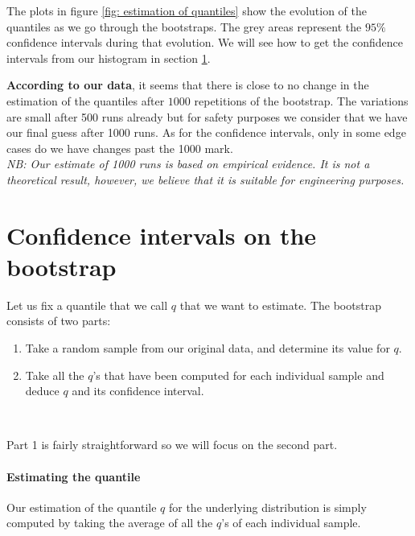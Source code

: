 \documentclass{article}
\begin{document}
The plots in figure \ref{fig: estimation of quantiles} show the evolution of the quantiles as we go through the bootstraps. The grey areas represent the $95\%$ confidence intervals during that evolution. We will see how to get the confidence intervals from our histogram in section \ref{section: confidence intervals on the bootstrap}.

\textbf{According to our data}, it seems that there is close to no change in the estimation of the quantiles after $1000$ repetitions of the bootstrap. The variations are small after 500 runs already but for safety purposes we consider that we have our final guess after 1000 runs. As for the confidence intervals, only in some edge cases do we have changes past the 1000 mark. \\
\textit{NB: Our estimate of 1000 runs is based on empirical evidence. It is not a theoretical result, however, we believe that it is suitable for engineering purposes.}


\section{Confidence intervals on the bootstrap}
\label{section: confidence intervals on the bootstrap}

Let us fix a quantile that we call $q$ that we want to estimate. The bootstrap consists of two parts:

\begin{enumerate}
    \item[Part 1] Take a random sample from our original data, and determine its value for $q$.
    \item[Part 2] Take all the $q$'s that have been computed for each individual sample and deduce $q$ and its confidence interval.
\end{enumerate}\

Part 1 is fairly straightforward so we will focus on the second part.

\paragraph{Estimating the quantile} Our estimation of the quantile $q$ for the underlying distribution is simply computed by taking the average of all the $q$'s of each individual sample.
\end{document}
